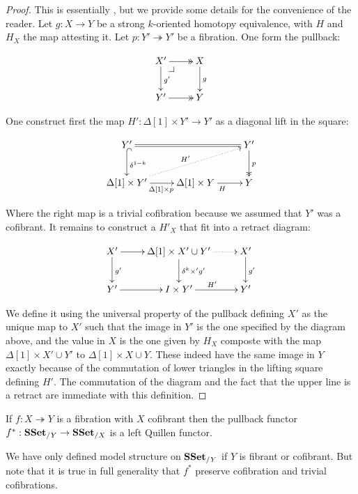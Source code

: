 \documentclass[reqno,10pt,a4paper,oneside,draft]{amsart}
\begin{document}
\begin{proof} This is essentially \cite[Lemma~3.7]{gambino2017frobenius}, but we provide some details
for the convenience of the reader.
Let $g :X \rightarrow Y$ be a strong $k$-oriented homotopy equivalence, with $H$ and $H_X$ the map attesting it. Let $p: Y' \twoheadrightarrow Y'$ be a fibration. One form the pullback:

\[\xymatrix{
X' \ar@{->>}[r] \drpullback \ar[d]^{g'} & X \ar[d]^{g} \\
Y' \ar@{->>}[r] & Y\\
}\]

One construct first the map $H': \Delta[1] \times Y' \rightarrow Y'$ as a diagonal lift in the square:


\[\xymatrix{
Y' \ar@{^{(}->}[d]^{\delta^{1-k}} \ar@{=}[rr] & & Y' \ar@{->>}[d]^p \\ 
\Delta[1] \times Y' \ar[r]_{\Delta[1] \times p} \ar@{.>}[urr]^{H'} & \Delta[1] \times Y \ar[r]_H & Y
}\]

Where the right map is a trivial cofibration because we assumed that $Y'$ was a cofibrant.
It remains to construct a $H'_X$ that fit into a retract diagram:


\[\xymatrix{X' \ar[d]^{g'} \ar[r] & \Delta[1] \times X' \cup Y' \ar[d]^{\delta^k \times' g'} \ar@{.>}[r] & X' \ar[d]^{g'} \\
Y' \ar[r] & I \times Y' \ar[r]^{H'} & Y' 
}\]

We define it using the universal property of the pullback defining $X'$ as the unique map to $X'$ such that the image in $Y'$ is the one specified by the diagram above, and the value in $X$ is the one given by $H_X$ composte with the map $ \Delta[1] \times X' \cup Y'$ to $ \Delta[1] \times X \cup Y$. These indeed have the same image in $Y$ exactly because of the commutation of lower triangles in the lifting square defining $H'$. The commutation of the diagram and the fact that the upper line is a retract are immediate with this definition.
\end{proof}



\begin{proposition}\label{prop:Frobenius}
If $f:X \twoheadrightarrow Y$ is a fibration with $X$ cofibrant then the pullback functor $f^* : \mathbf{SSet}_{/Y} \rightarrow \mathbf{SSet}_{/X}$ is a left Quillen functor.
\end{proposition}

We have only defined model structure on $\mathbf{SSet}_{/Y}$ if $Y$ is fibrant or cofibrant. But note that it is true in full generality that $f^*$ preserve cofibration and trivial cofibrations.
\end{document}
